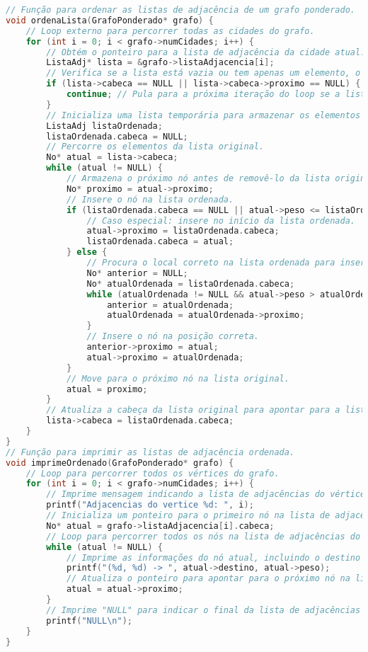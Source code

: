 \documentclass{article}
\begin{document}
\begin{lstlisting}[caption={grafo.c},label={lst:cod1},language=C]
// Função para ordenar as listas de adjacência de um grafo ponderado.
void ordenaLista(GrafoPonderado* grafo) {
    // Loop externo para percorrer todas as cidades do grafo.
    for (int i = 0; i < grafo->numCidades; i++) {
        // Obtém o ponteiro para a lista de adjacência da cidade atual.
        ListaAdj* lista = &grafo->listaAdjacencia[i];
        // Verifica se a lista está vazia ou tem apenas um elemento, o que significa que já está ordenada.
        if (lista->cabeca == NULL || lista->cabeca->proximo == NULL) {
            continue; // Pula para a próxima iteração do loop se a lista já estiver ordenada.
        }
        // Inicializa uma lista temporária para armazenar os elementos ordenados.
        ListaAdj listaOrdenada;
        listaOrdenada.cabeca = NULL;
        // Percorre os elementos da lista original.
        No* atual = lista->cabeca;
        while (atual != NULL) {
            // Armazena o próximo nó antes de removê-lo da lista original.
            No* proximo = atual->proximo;
            // Insere o nó na lista ordenada.
            if (listaOrdenada.cabeca == NULL || atual->peso <= listaOrdenada.cabeca->peso) {
                // Caso especial: insere no início da lista ordenada.
                atual->proximo = listaOrdenada.cabeca;
                listaOrdenada.cabeca = atual;
            } else {
                // Procura o local correto na lista ordenada para inserir o nó.
                No* anterior = NULL;
                No* atualOrdenada = listaOrdenada.cabeca;
                while (atualOrdenada != NULL && atual->peso > atualOrdenada->peso) {
                    anterior = atualOrdenada;
                    atualOrdenada = atualOrdenada->proximo;
                }
                // Insere o nó na posição correta.
                anterior->proximo = atual;
                atual->proximo = atualOrdenada;
            }
            // Move para o próximo nó na lista original.
            atual = proximo;
        }
        // Atualiza a cabeça da lista original para apontar para a lista ordenada.
        lista->cabeca = listaOrdenada.cabeca;
    }
}
// Função para imprimir as listas de adjacência ordenada.
void imprimeOrdenado(GrafoPonderado* grafo) {
    // Loop para percorrer todos os vértices do grafo.
    for (int i = 0; i < grafo->numCidades; i++) {
        // Imprime mensagem indicando a lista de adjacências do vértice i.
        printf("Adjacencias do vertice %d: ", i);
        // Inicializa um ponteiro para o primeiro nó na lista de adjacências do vértice i.
        No* atual = grafo->listaAdjacencia[i].cabeca;
        // Loop para percorrer todos os nós na lista de adjacências do vértice i.
        while (atual != NULL) {
            // Imprime as informações do nó atual, incluindo o destino e o peso da aresta.
            printf("(%d, %d) -> ", atual->destino, atual->peso);
            // Atualiza o ponteiro para apontar para o próximo nó na lista de adjacências.
            atual = atual->proximo;
        }
        // Imprime "NULL" para indicar o final da lista de adjacências do vértice i.
        printf("NULL\n");
    }
}
\end{lstlisting}
\end{document}
